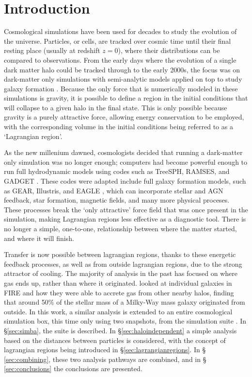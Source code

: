 \section{Introduction}
\label{sec:introduction}

Cosmological simulations have been used for decades to study the evolution of
the universe. Particles, or cells, are tracked over cosmic time until their
final resting place (usually at redshift $z=0$), where their distributions can
be compared to observations. From the early days where the evolution of a
single dark matter halo could be tracked through to the early 2000s, the focus
was on dark-matter only simulations \citep{frenk1988,
springel_simulations_2005} with semi-analytic models applied on top to study
galaxy formation \citep{porter_2014, henriques_2015, lacey_2016}. Because the
only force that is numerically modeled in these simulations is gravity, it is
possible to define a region in the initial conditions that will collapse to a
given halo in the final state. This is only possible because gravity is a
purely attractive force, allowing energy conservation to be employed, with the
corresponding volume in the initial conditions being referred to as a
`Lagrangian region'.

As the new millenium dawned, cosmologists decided that running a dark-matter
only simulation was no longer enough; computers had become powerful enough to
run full hydrodynamic models using codes such as TreeSPH, RAMSES, and GADGET
\citep{Hernquist1989, teyssier2002, Springel2005}. These codes were adapted
include full galaxy formation models, such as GEAR, Illustris, and EAGLE
\citep{Revaz2011, vogelsberger_properties_2014, Schaye2015}, which can
incorporate stellar and AGN feedback, star formation, magnetic fields, and many
more physical proceses.  These processes break the `only attractive' force
field that was once present in the simulation, making Lagrangian regions less
effective as a diagnostic tool. There is no longer a simple, one-to-one,
relationship between where the matter started, and where it will finish.

Transfer is now possible between lagrangian regions, thanks to these energetic
feedback processes, as well as from outside lagrangian regions, due to the
strong attractor of cooling. The majority of analysis in the past has focused
on where gas ends up, rather than where it originated.
\citet{anglesalcazar2016} looked at individual galaxies in FIRE
\citep{fireproject2014} and how they were able to accrete gas from other nearby
halos, finding that around 50\% of the stellar mass of a Milky-Way mass galaxy
originated from outside. In this work, a similar analysis is extended to an
entire cosmological simulation box, this time only using two snapshots, from
the \simba{} simulation suite \citep{dave2018}. In \S \ref{sec:simba}, the
\simba{} suite is described.  In \S \ref{sec:haloindependent} a simple analysis
based on the distances between particles is considered, with the concept of
lagrangian regions being introduced in \S \ref{sec:lagrangianregions}. In \S
\ref{sec:combining}, these two analysis pathways are combined, and in \S
\ref{sec:conclusions} the conclusions are presented.

